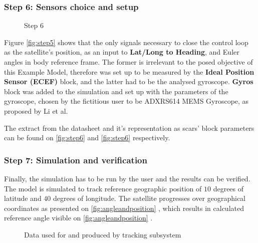         \subsubsection*{Step 6: Sensors choice and setup}
            \begin{figure}[H]
                \centering
                \qquad
                \caption{Step 6}%
                \label{fig:step6}%
            \end{figure}
            Figure \autoref{fig:step5} shows that the only signals necessary to close the control loop as the satellite's position, as an input to \textbf{Lat/Long to Heading}, and Euler angles in body reference frame. The former is irrelevant to the posed objective of this Example Model, therefore was set up to be measured by the \textbf{Ideal Position Sensor (ECEF)} block, and the latter had to be the analysed gyroscope. \textbf{Gyros} block was added to the simulation and set up with the parameters of the gyroscope, chosen by the fictitious user to be ADXRS614 MEMS Gyroscope, as proposed by Li et al\cite{li2013design}.
            
            The extract from the datasheet and it's representation as \ac{scars}' block parameters can be found on \autoref{fig:step6}  and \autoref{fig:step6}  respectively.

        \subsubsection*{Step 7: Simulation and verification}
            Finally, the simulation has to be run by the user and the results can be verified. The model is simulated to track reference geographic position of $10$ degrees of latitude and $40$ degrees of longitude. The satellite progresses over geographical coordinates as presented on \autoref{fig:angleandposition} , which results in calculated reference angle visible on \autoref{fig:angleandposition} .

            \begin{figure}[H]
                \centering
                \qquad
                \caption{Data used for and produced by tracking subsystem}%
                \label{fig:angleandposition}%
            \end{figure}
                         
